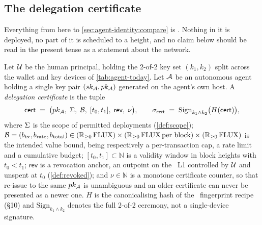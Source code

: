 \subsection{The delegation certificate}
\label{sec:agent-identity:cert}

Everything from here to \cref{sec:agent-identity:compare} is \planned. Nothing in it is deployed, no
part of it is scheduled to a height, and no claim below should be read in the present tense as a
statement about the network.

\begin{definition}
\label{def:cert}
Let $\mathcal{U}$ be the human principal, holding the 2-of-2 key set $(k_1,k_2)$ split across the
wallet and key devices of \cref{tab:agent-today}. Let $\mathcal{A}$ be an autonomous agent holding a
single key pair $(sk_{\mathcal{A}}, pk_{\mathcal{A}})$ generated on the agent's own host. A \emph{delegation
certificate} is the tuple
\[
  \mathsf{cert} \;=\; \bigl(pk_{\mathcal{A}},\; \Sigma,\; \mathcal{B},\; [t_0,t_1],\; \mathsf{rev},\; \nu\bigr),
  \qquad
  \sigma_{\mathsf{cert}} \;=\; \mathrm{Sign}_{k_1 \wedge k_2}\bigl(H(\mathsf{cert})\bigr),
\]
where
$\Sigma$ is the scope of permitted deployments (\cref{def:scope});
$\mathcal{B} = (b_{\mathrm{tx}}, b_{\mathrm{rate}}, b_{\mathrm{total}}) \in
(\mathbb{R}_{\ge 0}\,\mathrm{FLUX}) \times (\mathbb{R}_{\ge 0}\,\mathrm{FLUX}\,\text{per block}) \times
(\mathbb{R}_{\ge 0}\,\mathrm{FLUX})$ is the intended value bound, being respectively a per-transaction cap, a
rate limit and a cumulative budget;
$[t_0,t_1] \subset \mathbb{N}$ is a validity window in block heights with $t_0 < t_1$;
$\mathsf{rev}$ is a revocation anchor, an outpoint on the \Flux\ L1 controlled by $\mathcal{U}$ and
unspent at $t_0$ (\cref{def:revoked});
and $\nu \in \mathbb{N}$ is a monotone certificate counter, so that re-issue to the same
$pk_{\mathcal{A}}$ is unambiguous and an older certificate can never be presented as a newer one.
$H$ is the canonicalising hash of the \appspec\ fingerprint recipe (\S10) and
$\mathrm{Sign}_{k_1 \wedge k_2}$ denotes the full 2-of-2 ceremony, not a single-device signature.
\end{definition}


